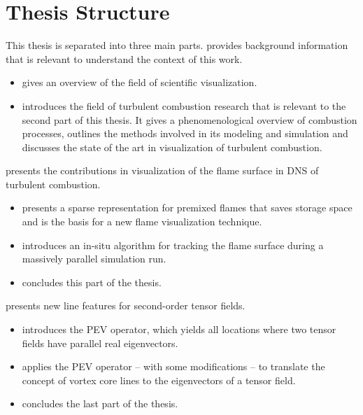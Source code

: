 \section{Thesis Structure} %
\label{sec:thesis_structure}
%
This thesis is separated into three main parts.
%
 provides background information that is relevant to
understand the context of this work.
%
\begin{itemize}
    \item {} gives an overview of the field of scientific
    visualization.
    \item {} introduces the field of turbulent
    combustion research that is relevant to the second part of this thesis.
    It gives a phenomenological overview of combustion processes, outlines the
    methods involved in its modeling and simulation and discusses the state of
    the art in visualization of turbulent combustion.
\end{itemize}
%
%
 presents the contributions in visualization of the flame
surface in \ac{DNS} of turbulent combustion.
%
\begin{itemize}
    \item {} presents a sparse representation
    for premixed flames that saves storage space and is the basis for a new
    flame visualization technique.
    \item {} introduces an in-situ algorithm for
    tracking the flame surface during a massively parallel simulation run.
    \item {} concludes this part of the thesis.
\end{itemize}
%
%
 presents new line features for second-order tensor
fields.
%
\begin{itemize}
    \item {} introduces the \ac{PEV} operator,
    which yields all locations where two tensor fields have parallel real
    eigenvectors.
    \item {} applies the \ac{PEV} operator -- with
    some modifications -- to translate the concept of vortex core lines to the
    eigenvectors of a tensor field.
    \item {} concludes the last part of the
    thesis.
\end{itemize}
%
%
\clearpage
